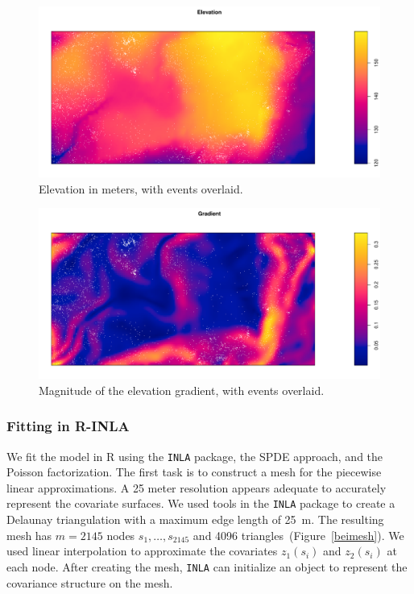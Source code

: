 \documentclass[]{interact}
\begin{document}
\begin{figure}[h]
\includegraphics[width=\textwidth]{figures/beielev.pdf}
\caption{Elevation in meters, with events overlaid.}
\label{beielev}
\end{figure}

\begin{figure}[h]
\includegraphics[width=\textwidth]{figures/beigrad.pdf}
\caption{Magnitude of the elevation gradient, with events overlaid.}
\label{beigrad}
\end{figure}


\subsubsection{Fitting in R-INLA}

We fit the model in R using the \texttt{INLA} package, the SPDE approach, and
the Poisson factorization. The first task is to construct a mesh for the
piecewise linear approximations. A 25 meter resolution appears adequate to
accurately represent the covariate surfaces. We used tools in the \texttt{INLA}
package to create a Delaunay triangulation with a maximum edge length of 25~m.
The resulting mesh has \(m = 2145\) nodes \(s_{1},  \dots, s_{2145}\) and 4096
triangles~(Figure~\ref{beimesh}). We used linear interpolation to approximate
the covariates \(z_{1}(s_{i})\) and \(z_{2}(s_{i})\) at each node. After
creating the mesh, \texttt{INLA} can initialize an object to represent the
covariance structure on the mesh.
\end{document}

